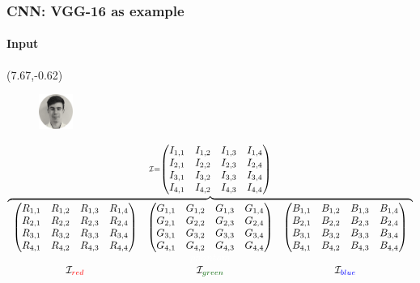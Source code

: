 \begin{frame}
\frametitle{CNN: VGG-16 as example}
\framesubtitle{Input} 

\begin{textblock}{15}(7.67,-0.62)
	\begin{figure}[H]
		\includegraphics[width=0.1\textwidth]{Images/Team/DamienTOOMEY.png} 
	\end{figure}
\end{textblock}

\begin{adjustwidth}{-1.5em}{-1.5em}
\setlength\arraycolsep{2pt}

\[ \overbrace{\begin{array}{ccc}
\begin{pmatrix}
R_{1,1} & R_{1,2} & R_{1,3} & R_{1,4} \\
R_{2,1} & R_{2,2} & R_{2,3} & R_{2,4} \\
R_{3,1} & R_{3,2} & R_{3,3} & R_{3,4} \\
R_{4,1} & R_{4,2} & R_{4,3} & R_{4,4} \\
\end{pmatrix}
& \begin{pmatrix}
G_{1,1} & G_{1,2} & G_{1,3} & G_{1,4} \\
G_{2,1} & G_{2,2} & G_{2,3} & G_{2,4} \\
G_{3,1} & G_{3,2} & G_{3,3} & G_{3,4} \\
G_{4,1} & G_{4,2} & G_{4,3} & G_{4,4} \\
\end{pmatrix}
& \begin{pmatrix}
B_{1,1} & B_{1,2} & B_{1,3} & B_{1,4} \\
B_{2,1} & B_{2,2} & B_{2,3} & B_{2,4} \\
B_{3,1} & B_{3,2} & B_{3,3} & B_{3,4} \\
B_{4,1} & B_{4,2} & B_{4,3} & B_{4,4} \\
\end{pmatrix} \\
& \textcolor{white}{phantom} & \\
\mathcal{I}_{\textcolor{red}{red}} & \mathcal{I}_{\textcolor{green}{green}} & \mathcal{I}_{\textcolor{blue}{blue}} \\
\end{array}}^{\mathcal{I} = \begin{pmatrix}
I_{1,1} & I_{1,2} & I_{1,3} & I_{1,4} \\
I_{2,1} & I_{2,2} & I_{2,3} & I_{2,4} \\
I_{3,1} & I_{3,2} & I_{3,3} & I_{3,4} \\
I_{4,1} & I_{4,2} & I_{4,3} & I_{4,4} \\
\end{pmatrix}}
\]

\end{adjustwidth}
\end{frame}


